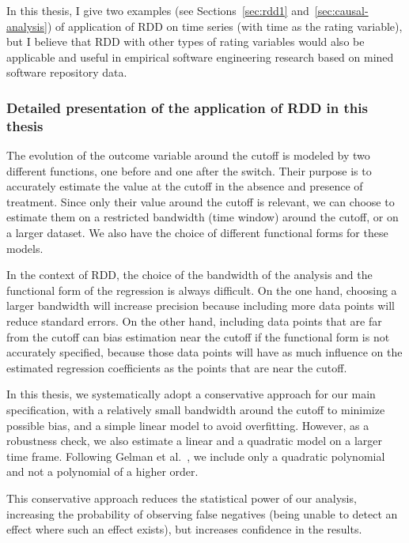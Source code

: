 In this thesis, I give two examples (see Sections~\ref{sec:rdd1} and~\ref{sec:causal-analysis}) of application of RDD on time series (with time as the rating variable), but I believe that RDD with other types of rating variables would also be applicable and useful in empirical software engineering research based on mined software repository data.

\subsubsection{Detailed presentation of the application of RDD in this thesis}

The evolution of the outcome variable around the cutoff is modeled by two different functions, one before and one after the switch.
Their purpose is to accurately estimate the value at the cutoff in the absence and presence of treatment.
Since only their value around the cutoff is relevant, we can choose to estimate them on a restricted bandwidth (time window) around the cutoff, or on a larger dataset.
We also have the choice of different functional forms for these models.

In the context of RDD, the choice of the bandwidth of the analysis and the functional form of the regression is always difficult.
On the one hand, choosing a larger bandwidth will increase precision because including more data points will reduce standard errors.
On the other hand, including data points that are far from the cutoff can bias estimation near the cutoff if the functional form is not accurately specified, because those data points will have as much influence on the estimated regression coefficients as the points that are near the cutoff.

In this thesis, we systematically adopt a conservative approach for our main specification, with a relatively small bandwidth around the cutoff to minimize possible bias, and a simple linear model to avoid overfitting.
However, as a robustness check, we also estimate a linear and a quadratic model on a larger time frame.
Following Gelman et al.~\cite{gelman2018high}, we include only a quadratic polynomial and not a polynomial of a higher order.

This conservative approach reduces the statistical power of our analysis, increasing the probability of observing false negatives (being unable to detect an effect where such an effect exists), but increases confidence in the results.

